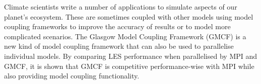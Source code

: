 Climate scientists write a number of applications to simulate aspects of our
planet's ecosystem. These are sometimes coupled with other models using model
coupling frameworks to improve the accuracy of results or to model more
complicated scenarios. The Glasgow Model Coupling Framework (GMCF) is a new kind
of model coupling framework that can also be used to parallelise individual
models. By comparing LES performance when parallelised by MPI and GMCF, it is
shown that GMCF is competitive performance-wise with MPI while also providing
model coupling functionality.
